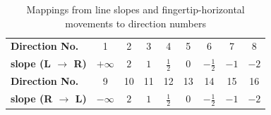         \begin{table}[!t]
            \centering
            \caption{Mappings from line slopes and fingertip-horizontal movements to direction numbers}
            \label{tab:slopes}
            \small
            \begin{tabular}{lcccccccc}
                \toprule
                \textbf{Direction No.}& 1 & 2 & 3 & 4 & 5 & 6 & 7 & 8 \\
                \textbf{slope (L $\rightarrow$ R)} & $+\infty$ & $2$ & $1$ & $\frac{1}{2}$ & $0$ & $-\frac{1}{2}$ & $-1$ & $-2$ \\
                \midrule
                \textbf{Direction No.}& 9 & 10 & 11 & 12 & 13 & 14 & 15 & 16 \\
                \textbf{slope (R $\rightarrow$ L)} & $-\infty$ & $2$ & $1$ & $\frac{1}{2}$ & $0$ & $-\frac{1}{2}$ & $-1$ & $-2$ \\
                \bottomrule
            \end{tabular}
            \vspace{-2mm}
        \end{table}

